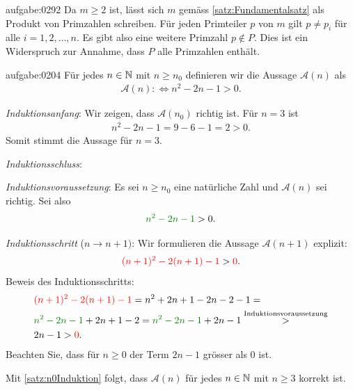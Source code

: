\begin{antwort}{aufgabe:0292}
Da $m\geq 2$ ist, lässt sich $m$ gemäss \cref{satz:Fundamentalsatz} als Produkt von Primzahlen schreiben. Für jeden Primteiler $p$ von $m$ gilt $p\neq p_i$ für alle $i=1,2,\ldots , n$. Es gibt also eine weitere Primzahl $p\notin P$. Dies ist ein Widerspruch zur Annahme, dass $P$ alle Primzahlen enthält.
\end{antwort}


\begin{antwort}{aufgabe:0204}
Für jedes $n\in\mathbb{N}$ mit $n\geq n_0$ definieren wir die Aussage $\mathcal{A}(n)$ als
\begin{align*}
    \mathcal{A}(n) :\iff n^2-2n-1 > 0.
\end{align*}
\begin{aenum}
    \item \textit{Induktionsanfang}: Wir zeigen, dass $\mathcal{A}(n_0)$ richtig ist. Für $n=3$ ist
    \begin{align*}
        n^2-2n-1 = 9-6-1 = 2 > 0.
    \end{align*}
    Somit stimmt die Aussage für $n=3$.
    \item \textit{Induktionsschluss}:
        \begin{renum}
            \item \textit{Induktionsvoraussetzung}: Es sei $n\geq n_0$ eine natürliche Zahl und $\mathcal{A}(n)$ sei richtig. Sei also
            \begin{align*}
                \textcolor{Green}{n^2-2n-1} > 0.
            \end{align*}
            \item \textit{Induktionsschritt} ($n\to n+1)$: Wir formulieren die Aussage $\mathcal{A}(n+1)$ explizit:
            \begin{align*}
                \textcolor{Red}{(n+1)^2-2(n+1)-1} > \textcolor{Red}{0}.
            \end{align*}
            Beweis des Induktionsschritts:
            \begin{align*}
                &\textcolor{Red}{(n+1)^2-2(n+1)-1} = n^2 + 2n + 1 - 2n - 2 - 1 = \\
                &\textcolor{Green}{n^2-2n-1} + 2n+1-2 = \textcolor{Green}{n^2-2n-1} + 2n-1 \stackrel{\text{Induktionsvoraussetzung}}{>}\\
                &2n-1 > \textcolor{Red}{0}.
            \end{align*}
        Beachten Sie, dass für $n\geq 0$ der Term $2n-1$ grösser als $0$ ist.
        \end{renum}
\end{aenum}
Mit \cref{satz:n0Induktion} folgt, dass $\mathcal{A}(n)$ für jedes $n\in\mathbb{N}$ mit $n\geq 3$ korrekt ist.
\end{antwort}


